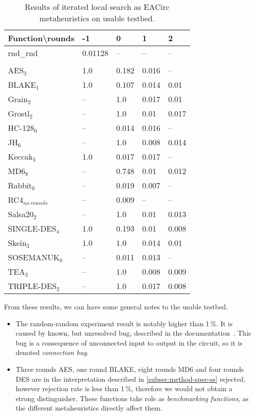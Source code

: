 \documentclass[
  print, %
  Table,   %
  nolof,     %
  nolot,     %
  11pt, %
  oneside  %
]{fithesis3}
\newcommand{\fd}{\cellcolor{red!13}}
\newcommand{\fn}{\cellcolor{green!13}}
\begin{document}
\begin{table}[H]
\centering
\begin{tabular}{l|l l l l}
Function\textbackslash{}rounds & -1 & 0 & 1 & 2\\ \hline
rnd\_rnd         & \fn{}0.01128 & --       & --         & --        \\\\
AES$_{3}$        & \fd{}1.0   & \fd{}0.182 & \fn{}0.016 & \fn{}--   \\
BLAKE$_{1}$      & \fd{}1.0   & \fd{}0.107 & \fn{}0.014 & \fn{}0.01 \\
Grain$_{2}$      & \fd{}--    & \fd{}1.0   & \fn{}0.017 & \fn{}0.01 \\
Grostl$_{2}$     & \fd{}--    & \fd{}1.0   & \fn{}0.01  & \fn{}0.017\\
HC-128$_{0}$     & \fd{}--    & \fn{}0.014 & \fn{}0.016 & \fn{}--   \\
JH$_{6}$         & \fd{}--    & \fd{}1.0   & \fn{}0.008 & \fn{}0.014\\
Keccak$_{3}$     & \fd{}1.0   & \fn{}0.017 & \fn{}0.017 & \fn{}--   \\
MD6$_{8}$        & \fd{}--    & \fd{}0.748 & \fn{}0.01  & \fn{}0.012\\
Rabbit$_{0}$     & \fd{}--    & \fn{}0.019 & \fn{}0.007 & \fn{}--   \\
RC4$_{no~rounds}$& --         & \fn{}0.009 & --         & --        \\
Salsa20$_{2}$    & \fd{}--    & \fd{}1.0   & \fn{}0.01  & \fn{}0.013\\
SINGLE-DES$_{4}$ & \fd{}1.0   & \fd{}0.193 & \fn{}0.01  & \fn{}0.008\\
Skein$_{3}$      & \fd{}1.0   & \fd{}1.0   & \fn{}0.014 & \fn{}0.01 \\
SOSEMANUK$_{0}$  & \fd{}--    & \fn{}0.011 & \fn{}0.013 & \fn{}--   \\
TEA$_{3}$        & \fd{}--    & \fd{}1.0   & \fn{}0.008 & \fn{}0.009\\
TRIPLE-DES$_{2}$ & \fd{}--    & \fd{}1.0   & \fn{}0.017 & \fn{}0.008
\end{tabular}
\caption{Results of iterated local search as EACirc metaheuristics on usable testbed.}
\label{table:res-usable-ils}
\end{table}

From these results, we can have some general notes to the usable testbed.

\begin{itemize}
    \item The random-random experiment result is notably higher than 1\,\%. It is caused by known, but unresolved bug, described in the documentation~\cite{EACirc-wiki-bug}. This bug is a consequence of unconnected input to output in the circuit, so it is denoted \textit{connection bug}.
    \item Three rounds AES, one round BLAKE, eight rounds MD6 and four rounds DES are in the interpretation described in \cref{subsec:method-spec-ss} rejected, however rejection rate is less than 1\,\%, therefore we would not obtain a strong distinguisher. These functions take role as \textit{benchmarking functions}, as the different metaheuristics directly affect them.
\end{itemize}
\end{document}
